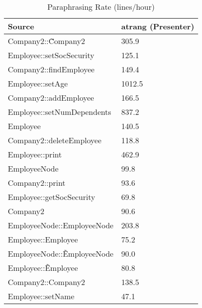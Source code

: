 \begin{table}[hb]
\begin{center}
\begin{tabular}{|l|l|}
\hline
Source & atrang (Presenter)\\
\hline
Company2::\~Company2 & 305.9\\
Employee::setSocSecurity & 125.1\\
Company2::findEmployee & 149.4\\
Employee::setAge & 1012.5\\
Company2::addEmployee & 166.5\\
Employee::setNumDependents & 837.2\\
Employee & 140.5\\
Company2::deleteEmployee & 118.8\\
Employee::print & 462.9\\
EmployeeNode & 99.8\\
Company2::print & 93.6\\
Employee::getSocSecurity & 69.8\\
Company2 & 90.6\\
EmployeeNode::EmployeeNode & 203.8\\
Employee::Employee & 75.2\\
EmployeeNode::\~EmployeeNode & 90.0\\
Employee::\~Employee & 80.8\\
Company2::Company2 & 138.5\\
Employee::setName & 47.1\\
\hline
\end{tabular}
\end{center}
\caption{Paraphrasing Rate (lines/hour)}
\end{table}

